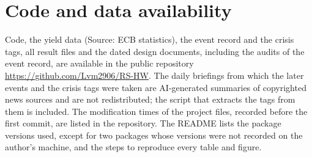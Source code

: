 \documentclass[11pt,a4paper]{article}
\begin{document}
\section*{Code and data availability}
Code, the yield data (Source: ECB statistics), the event record and the crisis tags, all result files and the dated design documents, including the audits of the event record, are available in the public repository \url{https://github.com/Lvm2906/RS-HW}. The daily briefings from which the later events and the crisis tags were taken are AI-generated summaries of copyrighted news sources and are not redistributed; the script that extracts the tags from them is included. The modification times of the project files, recorded before the first commit, are listed in the repository. The README lists the package versions used, except for two packages whose versions were not recorded on the author's machine, and the steps to reproduce every table and figure.



\end{document}
